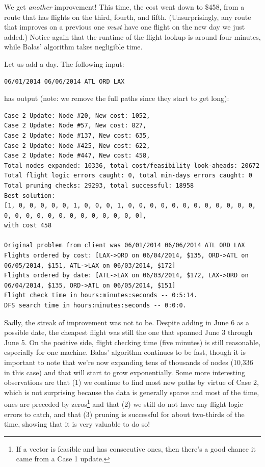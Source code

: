 \documentclass{article}
\begin{document}
We get \emph{another} improvement! This time, the cost went down to \$458, from a route that has flights on the third, fourth, and fifth.
(Unsurprisingly, any route that improves on a previous one \emph{must} have one flight on the new day we just added.) Notice again that the runtime of
the flight lookup is around four minutes, while Balas' algorithm takes negligible time.

Let us add a day. The following input:

\begin{verbatim}
06/01/2014 06/06/2014 ATL ORD LAX
\end{verbatim}

has output (note: we remove the full paths since they start to get long):

\scriptsize
\begin{verbatim}
Case 2 Update: Node #20, New cost: 1052, 
Case 2 Update: Node #57, New cost: 827, 
Case 2 Update: Node #137, New cost: 635, 
Case 2 Update: Node #425, New cost: 622, 
Case 2 Update: Node #447, New cost: 458, 
Total nodes expanded: 10336, total cost/feasibility look-aheads: 20672
Total flight logic errors caught: 0, total min-days errors caught: 0
Total pruning checks: 29293, total successful: 18958
Best solution:
[1, 0, 0, 0, 0, 0, 1, 0, 0, 0, 1, 0, 0, 0, 0, 0, 0, 0, 0, 0, 0, 0, 0, 0, 0, 0, 0, 0, 0, 0, 0, 0, 0, 0, 0, 0],
with cost 458

Original problem from client was 06/01/2014 06/06/2014 ATL ORD LAX
Flights ordered by cost: [LAX->ORD on 06/04/2014, $135, ORD->ATL on 06/05/2014, $151, ATL->LAX on 06/03/2014, $172]
Flights ordered by date: [ATL->LAX on 06/03/2014, $172, LAX->ORD on 06/04/2014, $135, ORD->ATL on 06/05/2014, $151]
Flight check time in hours:minutes:seconds -- 0:5:14.
DFS search time in hours:minutes:seconds -- 0:0:0.
\end{verbatim}
\normalsize

Sadly, the streak of improvement was not to be. Despite adding in June 6 as a possible date, the cheapest flight was still the one that spanned June 3
through June 5. On the positive side, flight checking time (five minutes) is still reasonable, especially for one machine. Balas' algorithm continues
to be fast, though it is important to note that we're now expanding tens of thousands of nodes (10,336 in this case) and that will start to grow
exponentially. Some more interesting observations are that (1) we continue to find most new paths by virtue of Case 2, which is not surprising because
the data is generally sparse and most of the time, ones are preceded by zeros\footnote{If a vector is feasible and has consecutive ones, then there's
a good chance it came from a Case 1 update.} and that (2) we still do not have any flight logic errors to catch, and that (3) pruning is successful
for about two-thirds of the time, showing that it is very valuable to do so!
\end{document}
